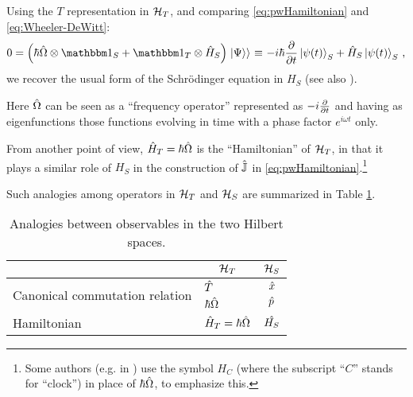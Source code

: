 
Using the $T$ representation in $\mathcal{H}_T$,
and comparing \eqref{eq:pwHamiltonian} and \eqref{eq:Wheeler-DeWitt}:
\begin{equation}\label{eq:schrod_from_pw}
  0 = \qty(\hbar\op{\Omega}\ox\idop_S + \idop_{T}\ox\op{H}_S)\dket{\Psi}
    \repr -i\hbar\pdv{t}\ket{\psi(t)}_{S} + \op{H}_S\ket{\psi(t)}_{S}
    \,\text{,}
\end{equation}
we recover the usual form of the Schr\"{o}dinger equation in $H_S$
(see also \cite[709--710]{Wootters:Loyola}).

Here $\hat{\Omega}$ can be seen as a ``frequency operator''
represented as $-i\pdv{t}$ and having as eigenfunctions
those functions evolving in time with a phase factor $e^{i \omega t}$ only.

From another point of view, $\hat{H}_{T} = \hbar\hat{\Omega}$ is the ``Hamiltonian'' of $\mathcal{H}_T$,
in that it plays a similar role of $H_S$ in the construction of
$\hat{\mathbb{J}}$ in \eqref{eq:pwHamiltonian}.\footnote{
  Some authors (e.g. in \citereset\cite{Wootters:Loyola})
  use the symbol $H_C$ (where the subscript ``$C$'' stands for ``clock'') in place of
  $\hbar\hat{\Omega}$, to emphasize this.
}

Such analogies among operators in $\mathcal{H}_T$ and $\mathcal{H}_S$ are summarized in Table \ref{tbl:op_comparison_pw}.

{
  \begin{table}
    \centering
    \begin{tabular}{l|l|c}
      & \multicolumn{1}{c|}{$\mathcal{H}_T$}   & \multicolumn{1}{|c}{$\mathcal{H}_S$}       \\
      \hline
      \multirow{2}{11em}{Canonical commutation relation} 
      & $\hat{T}$                                & $\hat{x}$                            \\
      & $\hbar\hat{\Omega}$                      & $\hat{p}$                            \\
      \hline
      Hamiltonian
      & $\hat{H}_T = \hbar\hat{\Omega}$           & $\hat{H_S}$
    \end{tabular}
    {\caption{
      Analogies between observables in the two Hilbert spaces.
    }\label{tbl:op_comparison_pw}}
  \end{table}
}


